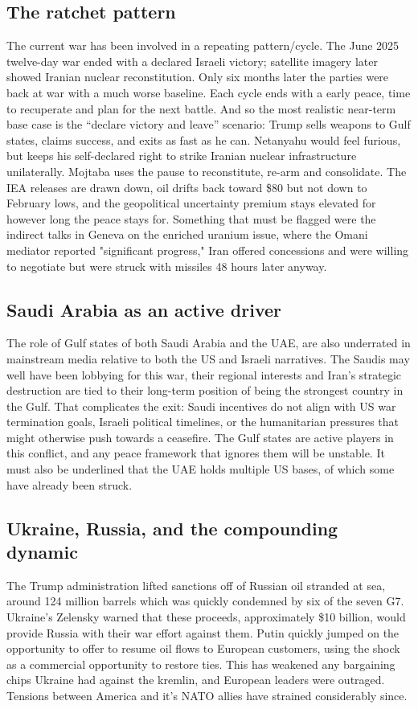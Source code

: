 \documentclass[12pt,a4paper]{article}
\begin{document}
\subsection{The ratchet pattern}
The current war has been involved in a repeating pattern/cycle. The June 2025 twelve-day war ended with a declared Israeli victory; satellite imagery later showed
Iranian nuclear reconstitution. Only six months later the parties were back at war with a much worse baseline. Each cycle ends with a early peace, time to recuperate and plan for the next battle. And so the most realistic near-term base case is the “declare victory and leave” scenario: Trump sells weapons to Gulf states, claims success, and exits as fast as he can. Netanyahu would feel furious, but keeps his self-declared right to strike Iranian nuclear infrastructure unilaterally. Mojtaba uses the pause to reconstitute, re-arm and consolidate. The IEA releases are drawn down, oil drifts back toward \$80 but not down to February lows, and the geopolitical uncertainty premium stays elevated for however long the peace stays for. Something that must be flagged were the indirect talks in Geneva on the enriched uranium issue, where the Omani mediator reported "significant progress," Iran offered concessions and were willing to negotiate but were struck with missiles 48 hours later anyway.



\subsection{Saudi Arabia as an active driver}
The role of Gulf states of both Saudi Arabia and the UAE, are also underrated in mainstream media relative to both the US and Israeli narratives. The Saudis may well have been lobbying for this war, their regional interests and Iran’s strategic destruction are tied to their long-term position of being the strongest country in the Gulf. That complicates the exit: Saudi incentives do not align with US war termination goals, Israeli political timelines, or the humanitarian pressures that might otherwise push towards a ceasefire. The Gulf states are active players in this conflict, and any peace framework that ignores them will be unstable. It must also be underlined that the UAE holds multiple US bases, of which some have already been struck. 


\subsection{Ukraine, Russia, and the compounding dynamic}
The Trump administration lifted sanctions off of Russian oil stranded at sea, around 124 million barrels which was quickly condemned by six of the seven G7. Ukraine’s Zelensky warned that these proceeds, approximately \$10 billion, would provide Russia with their war effort against them. Putin quickly jumped on the opportunity to offer to resume oil flows to European customers, using the shock as a commercial opportunity to restore ties. This has weakened any bargaining chips Ukraine had against the kremlin, and European leaders were outraged. Tensions between America and it's NATO allies have strained considerably since. 
\end{document}
